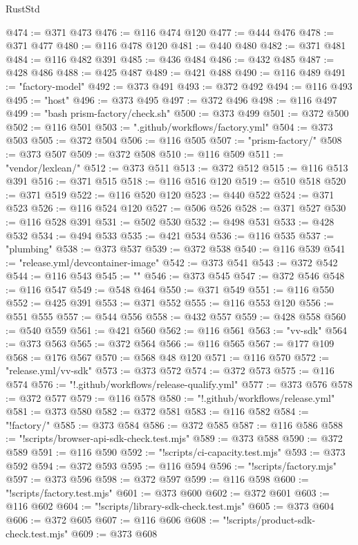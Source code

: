 \begin{lexlean}{RustStd}
\begin{coremodule}
@474 := @371 @473
@476 := @116 @474 @120
@477 := @444 @476
@478 := @371 @477
@480 := @116 @478 @120
@481 := @440 @480
@482 := @371 @481
@484 := @116 @482 @391
@485 := @436 @484
@486 := @432 @485
@487 := @428 @486
@488 := @425 @487
@489 := @421 @488
@490 := @116 @489
@491 := "factory-model"
@492 := @373 @491
@493 := @372 @492
@494 := @116 @493
@495 := "host"
@496 := @373 @495
@497 := @372 @496
@498 := @116 @497
@499 := "bash prism-factory/check.sh"
@500 := @373 @499
@501 := @372 @500
@502 := @116 @501
@503 := ".github/workflows/factory.yml"
@504 := @373 @503
@505 := @372 @504
@506 := @116 @505
@507 := "prism-factory/"
@508 := @373 @507
@509 := @372 @508
@510 := @116 @509
@511 := "vendor/lexlean/"
@512 := @373 @511
@513 := @372 @512
@515 := @116 @513 @391
@516 := @371 @515
@518 := @116 @516 @120
@519 := @510 @518
@520 := @371 @519
@522 := @116 @520 @120
@523 := @440 @522
@524 := @371 @523
@526 := @116 @524 @120
@527 := @506 @526
@528 := @371 @527
@530 := @116 @528 @391
@531 := @502 @530
@532 := @498 @531
@533 := @428 @532
@534 := @494 @533
@535 := @421 @534
@536 := @116 @535
@537 := "plumbing"
@538 := @373 @537
@539 := @372 @538
@540 := @116 @539
@541 := "release.yml/devcontainer-image"
@542 := @373 @541
@543 := @372 @542
@544 := @116 @543
@545 := ""
@546 := @373 @545
@547 := @372 @546
@548 := @116 @547
@549 := @548 @464
@550 := @371 @549
@551 := @116 @550
@552 := @425 @391
@553 := @371 @552
@555 := @116 @553 @120
@556 := @551 @555
@557 := @544 @556
@558 := @432 @557
@559 := @428 @558
@560 := @540 @559
@561 := @421 @560
@562 := @116 @561
@563 := "vv-sdk"
@564 := @373 @563
@565 := @372 @564
@566 := @116 @565
@567 := @177 @109
@568 := @176 @567
@570 := @568 @48 @120
@571 := @116 @570
@572 := "release.yml/vv-sdk"
@573 := @373 @572
@574 := @372 @573
@575 := @116 @574
@576 := "!.github/workflows/release-qualify.yml"
@577 := @373 @576
@578 := @372 @577
@579 := @116 @578
@580 := "!.github/workflows/release.yml"
@581 := @373 @580
@582 := @372 @581
@583 := @116 @582
@584 := "!factory/"
@585 := @373 @584
@586 := @372 @585
@587 := @116 @586
@588 := "!scripts/browser-api-sdk-check.test.mjs"
@589 := @373 @588
@590 := @372 @589
@591 := @116 @590
@592 := "!scripts/ci-capacity.test.mjs"
@593 := @373 @592
@594 := @372 @593
@595 := @116 @594
@596 := "!scripts/factory.mjs"
@597 := @373 @596
@598 := @372 @597
@599 := @116 @598
@600 := "!scripts/factory.test.mjs"
@601 := @373 @600
@602 := @372 @601
@603 := @116 @602
@604 := "!scripts/library-sdk-check.test.mjs"
@605 := @373 @604
@606 := @372 @605
@607 := @116 @606
@608 := "!scripts/product-sdk-check.test.mjs"
@609 := @373 @608

\end{coremodule}
\end{lexlean}
